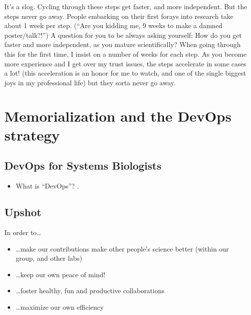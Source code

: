 \documentclass[letterpaper,10pt,english]{sphinxmanual}
\begin{document}
\sphinxAtStartPar
It’s a slog. Cycling through these steps get faster, and more independent. But the steps never go away.
People embarking on their first forays into research take about 1 week per step. (“Are you kidding me, 9 weeks to make a damned poster/talk?!”)
A question for you to be always asking yourself: How do you get faster and more independent, as you mature scientifically?
When going through this for the first time, I insist on a number of weeks for each step.
As you become more experience and I get over my trust issues, the steps accelerate \textendash{}in some cases a lot! (this acceleration is an honor for me to watch, and one of the single biggest joys in my professional life) \textendash{} but they sorta never go away.

\sphinxstepscope


\chapter{Memorialization and the DevOps strategy}
\label{\detokenize{03DevOps:memorialization-and-the-devops-strategy}}\label{\detokenize{03DevOps:devops}}\label{\detokenize{03DevOps::doc}}

\section{DevOps for Systems Biologists}
\label{\detokenize{03DevOps:devops-for-systems-biologists}}\begin{itemize}
\item {} 
\sphinxAtStartPar
What is “DevOps”? .

\end{itemize}


\section{Upshot}
\label{\detokenize{03DevOps:upshot}}
\sphinxAtStartPar
In order to…
\begin{itemize}
\item {} 
\sphinxAtStartPar
…make our contributions make other people’s science better (within our group, and other labs)

\item {} 
\sphinxAtStartPar
…keep our own peace of mind!

\item {} 
\sphinxAtStartPar
…foster healthy, fun and productive collaborations

\item {} 
\sphinxAtStartPar
…maximize our own efficiency

\end{itemize}
\end{document}
